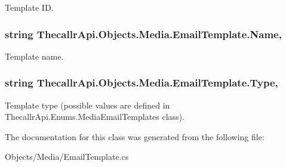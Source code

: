 Template I\+D. 

\hypertarget{class_thecallr_api_1_1_objects_1_1_media_1_1_email_template_a1492e7daee29809843604fc8378a64e5}{
\subsubsection[{Name}]{\setlength{\rightskip}{0pt plus 5cm}string Thecallr\+Api.\+Objects.\+Media.\+Email\+Template.\+Name\hspace{0.3cm}{\ttfamily [get]}, {\ttfamily [set]}}}\label{class_thecallr_api_1_1_objects_1_1_media_1_1_email_template_a1492e7daee29809843604fc8378a64e5}


Template name. 

\hypertarget{class_thecallr_api_1_1_objects_1_1_media_1_1_email_template_ae38f4e09ef638944137d7cf2082a4f0c}{
\subsubsection[{Type}]{\setlength{\rightskip}{0pt plus 5cm}string Thecallr\+Api.\+Objects.\+Media.\+Email\+Template.\+Type\hspace{0.3cm}{\ttfamily [get]}, {\ttfamily [set]}}}\label{class_thecallr_api_1_1_objects_1_1_media_1_1_email_template_ae38f4e09ef638944137d7cf2082a4f0c}


Template type (possible values are defined in Thecallr\+Api.\+Enums.\+Media\+Email\+Templates class). 



The documentation for this class was generated from the following file\+:\begin{DoxyCompactItemize}
\item 
Objects/\+Media/Email\+Template.\+cs\end{DoxyCompactItemize}
